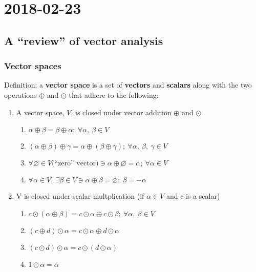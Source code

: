 \section{2018-02-23}

\subsection{A ``review'' of vector analysis}

\subsubsection{Vector spaces}

Definition: a \textbf{vector space} is a set of \textbf{vectors} and \textbf{scalars} along with the two operations $\oplus$ and $\odot$ that adhere to the following:

\begin{enumerate}
  \item A vector space, $V$, is closed under vector addition $\oplus$ and $\odot$

  \begin{enumerate}
    \item $\alpha \oplus \beta = \beta \oplus \alpha;\ \forall \alpha,\ \beta \in V$
    \item $(\alpha \oplus \beta) \oplus \gamma = \alpha \oplus (\beta \oplus \gamma);\ \forall \alpha,\ \beta,\ \gamma \in V$
    \item $\forall \varnothing \in V \text{(``zero'' vector)} \ni \alpha \oplus \varnothing = \alpha;\ \forall \alpha \in V$
    \item $\forall \alpha \in V,\ \exists \beta \in V \ni \alpha \oplus \beta = \varnothing;\ \beta = -\alpha$
  \end{enumerate}

  \item V is closed under scalar multplication (if $\alpha \in V$ and c is a scalar)

  \begin{enumerate}
    \item $c \odot (\alpha \oplus \beta) = c \odot \alpha \oplus c \odot \beta;\ \forall \alpha,\ \beta \in V$
    \item $(c \oplus d) \odot \alpha = c\odot\alpha \oplus d\odot \alpha$
    \item $(c \odot d) \odot \alpha = c \odot (d \odot \alpha)$
    \item $1 \odot \alpha = \alpha$
  \end{enumerate}
\end{enumerate} 

